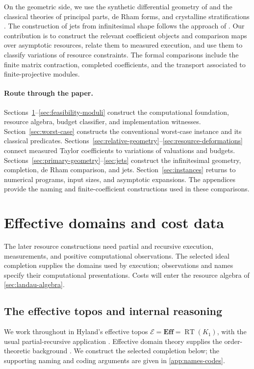 \documentclass[11pt,a4paper]{article}
\numberwithin{algorithm}{section}
\numberwithin{equation}{section}
\theoremstyle{definition}
\theoremstyle{remark}
\theoremstyle{plain}
\newcommand{\E}{\mathcal E}
\newcommand{\Eff}{\mathbf{Eff}}
\theoremstyle{definition}
\theoremstyle{plain}
\begin{document}
On the geometric side, we use the synthetic differential geometry of
\citet{Kock} and the classical theories of principal parts, de Rham
forms, and crystalline stratifications
\citep{GrothendieckDeRham,BerthelotOgus,Stacks}.
The construction of jets from infinitesimal shape follows the approach
of \citet{KS}. Our contribution is to construct the relevant coefficient
objects and comparison maps over asymptotic resources, relate them to
measured execution, and use them to classify variations of resource
constraints. The formal comparisons include the finite matrix
contraction, completed coefficients, and the transport associated to
finite-projective modules.

\paragraph{Route through the paper.}
Sections~\ref{sec:foundation}--\ref{sec:feasibility-moduli} construct
the computational foundation, resource algebra, budget classifier,
and implementation witnesses. Section~\ref{sec:worst-case} constructs
the conventional worst-case instance and its classical predicates.
Sections~\ref{sec:relative-geometry}--\ref{sec:resource-deformations}
connect measured Taylor coefficients to variations of valuations and
budgets. Sections~\ref{sec:primary-geometry}--\ref{sec:jets} construct
the infinitesimal geometry, completion, de Rham comparison, and jets.
Section~\ref{sec:instances} returns to numerical programs, input sizes,
and asymptotic expansions. The appendices provide the naming and
finite-coefficient constructions used in these comparisons.

\section{Effective domains and cost data}
\label{sec:foundation}

The later resource constructions need partial and recursive execution,
measurements, and positive computational observations. The selected
ideal completion supplies the domains used by execution; observations
and names specify their computational presentations. Costs will enter
the resource algebra of \cref{sec:landau-algebra}.

\subsection{The effective topos and internal reasoning}
We work throughout in Hyland's effective topos
$\E=\Eff=\operatorname{RT}(K_1)$, with the usual partial-recursive
application \citep{Hyland1982EffectiveTopos,VanOosten2008Realizability}.
Effective domain theory supplies the order-theoretic background
\citep{Smyth1977EffectiveDomains,AbramskyJung1994DomainTheory}.
We construct the selected completion below; the supporting naming and
coding arguments are given in \cref{app:names-codes}.
\end{document}
